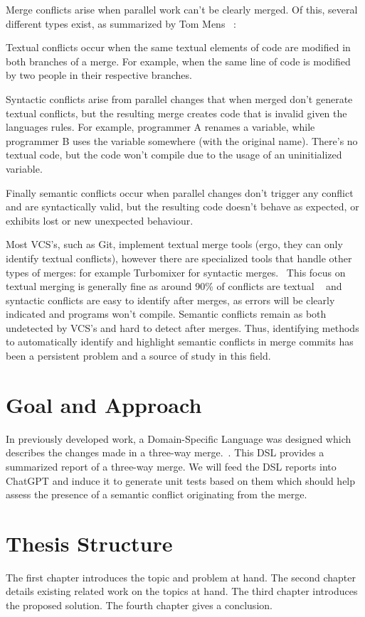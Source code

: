Merge conflicts arise when parallel work can't be clearly merged. Of this, several different types exist, as summarized by Tom Mens ~\citep{kn:tmens}:

Textual conflicts occur when the same textual elements of code are modified in both branches of a merge. For example, when the same line of code is modified by two people in their respective branches.

Syntactic conflicts arise from parallel changes that when merged don't generate textual conflicts, but the resulting merge creates code that is invalid given the languages rules. For example, programmer A renames a variable, while programmer B uses the variable somewhere (with the original name). There's no textual code, but the code won't compile due to the usage of an uninitialized variable.

Finally semantic conflicts occur when parallel changes don't trigger any conflict and are syntactically valid, but the resulting code doesn't behave as expected, or exhibits lost or new unexpected behaviour.

Most VCS's, such as Git, implement textual merge tools (ergo, they can only identify textual conflicts), however there are specialized tools that handle other types of merges: for example Turbomixer for syntactic merges.~\citep{kn:tmens} This focus on textual merging is generally fine as around 90\% of conflicts are textual ~\citep{kn:lcsd} and syntactic conflicts are easy to identify after merges, as errors will be clearly indicated and programs won't compile.
Semantic conflicts remain as both undetected by VCS's and hard to detect after merges. Thus, identifying methods to automatically identify and highlight semantic conflicts in merge commits has been a persistent problem and a source of study in this field. ~\citep{kn:nuno} ~\citep{kn:leuson} ~\citep{kn:leuson2}



\section{Goal and Approach} \label{sec:approach}

In previously developed work, a Domain-Specific Language was designed which describes the changes made in a three-way merge.~\citep{kn:nuno}. This DSL provides a summarized report of a three-way merge. We will feed the DSL reports into ChatGPT and induce it to generate unit tests based on them which should help assess the presence of a semantic conflict originating from the merge.






\section{Thesis Structure} \label{sec:struct}


The first chapter introduces the topic and problem at hand.
The second chapter details existing related work on the topics at hand.
The third chapter introduces the proposed solution.
The fourth chapter gives a conclusion.